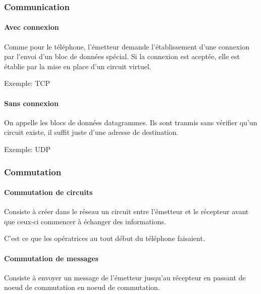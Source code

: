 \hypertarget{communication}{%
\subsubsection{Communication}\label{communication}}

\hypertarget{avec-connexion}{%
\paragraph{Avec connexion}\label{avec-connexion}}

Comme pour le téléphone, l'émetteur demande l'établissement d'une
connexion par l'envoi d'un bloc de données spécial. Si la connexion est
aceptée, elle est établie par la mise en place d'un circuit virtuel.

Exemple: TCP

\hypertarget{sans-connexion}{%
\paragraph{Sans connexion}\label{sans-connexion}}

On appelle les blocs de données datagrammes. Ils sont tranmis sans
vérifier qu'un circuit existe, il suffit juste d'une adresse de
destination.

Exemple: UDP

\hypertarget{commutation}{%
\subsubsection{Commutation}\label{commutation}}

\hypertarget{commutation-de-circuits}{%
\paragraph{Commutation de circuits}\label{commutation-de-circuits}}

Consiste à créer dans le réseau un circuit entre l'émetteur et le
récepteur avant que ceux-ci commencer à échanger des informations.

C'est ce que les opératrices au tout début du téléphone faisaient.

\hypertarget{commutation-de-messages}{%
\paragraph{Commutation de messages}\label{commutation-de-messages}}

Consiste à envoyer un message de l'émetteur jusqu'au récepteur en
passant de noeud de commutation en noeud de commutation.

